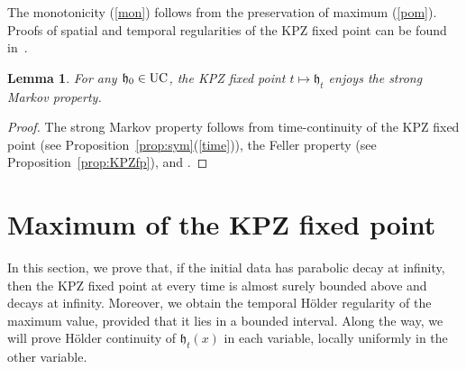 \documentclass[oneside,final,11pt]{amsart}
\newtheorem{lem}[thm]{Lemma}
\newtheorem{proposition}[thm]{Proposition}
\theoremstyle{definition}
\newcommand\hit{\uptext{Hit}}
\newcommand{\fh}{\mathfrak{h}}
\newcommand{\fg}{\mathfrak{g}}
\newcommand{\R}{\mathbb{R}}
\newcommand{\1}[1]{\mathbf{1}_{#1}}
\newcommand{\km}[1]{\marginnote{\tiny{\color{red}[KM: #1]}}}
\newcommand{\uptext}[1]{\text{\upshape{#1}}}
\DeclareMathOperator{\epi}{\uptext{epi}}
\DeclareMathOperator{\UC}{\uptext{UC}}
\DeclareMathOperator{\LC}{\uptext{LC}}
\newcommand{\fP}{\mathbf{P}}
\newcommand{\fK}{\mathbf{K}}
\renewcommand{\P}{\mathbb P}
\numberwithin{equation}{section}
\begin{document}
\noindent The monotonicity (\ref{mon}) follows from the preservation of maximum (\ref{pom}). Proofs of spatial and temporal regularities of the KPZ fixed point can be found in~\cite[Theorem~4.13 and Proposition~4.24]{fixedpt}.

\begin{lem}
For any $\fh_0\in \UC$, the KPZ fixed point $t \mapsto \fh_t$ enjoys the strong Markov property.
\end{lem}

\begin{proof}
The strong Markov property follows from time-continuity of the KPZ fixed point (see Proposition~\ref{prop:sym}(\ref{time})), the Feller property (see Proposition~\ref{prop:KPZfp}), and \cite[Theorem~2]{Dynkin}.
\end{proof}

%

\section{Maximum of the KPZ fixed point}\label{sec_max_kpz}
\label{sec:maximum}

In this section, we prove that, if the initial data has parabolic decay at infinity, then the KPZ fixed point at every time is almost surely bounded above and decays at infinity. Moreover, we obtain the temporal H\"{o}lder regularity of the maximum value, provided that it lies in a bounded interval. Along the way, we will prove H\"older continuity of $\fh_t(x)$ in each variable, locally uniformly in the other variable.
\end{document}
